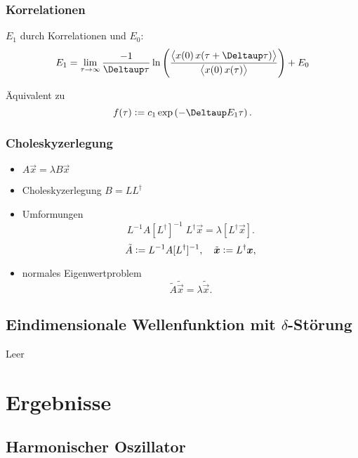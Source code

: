 \documentclass[ngerman, fleqn]{beamer}
\begin{document}
\begin{frame}
    \frametitle{Korrelationen}

    $E_1$ durch Korrelationen und $E_0$:
    \[
        E_1 = \lim_{\tau \to \infty} \frac{-1}{\Deltaup \tau} \ln
        \del{\frac{\Bracket{x(0) \, x(\tau + \Deltaup \tau)}}{\Bracket{x(0) \,
        x(\tau)}}} + E_0
    \]

    Äquivalent zu
    \[
        f(\tau) := c_1 \exp\del{-\Deltaup E_1 \tau}.
    \]
\end{frame}


\begin{frame}
    \frametitle{Choleskyzerlegung}

    \begin{itemize}
        \item
            $A \vec x = \lambda B \vec x$

        \item
            Choleskyzerlegung $B = L L^\dagger$ 

        \item
            Umformungen
            \[
                L^{-1} A [L^\dagger]^{-1} \; L^\dagger \vec x
                =
                \lambda [L^\dagger \vec x].
            \]
            \[
                \tilde{A} := L^{-1} A [L^\dagger]^{-1}
                ,\quad
                \tilde{\boldsymbol{x}} := L^\dagger \boldsymbol{x},
            \]

        \item
            normales Eigenwertproblem
            \[
                \tilde{A} \tilde{\vec x} = \lambda \tilde{\vec x}.
            \]
    \end{itemize}
\end{frame}

\subsection{Eindimensionale Wellenfunktion mit $\delta$-Störung}

\begin{frame}
    Leer
\end{frame}

\section{Ergebnisse}

\subsection{Harmonischer Oszillator}
\end{document}
